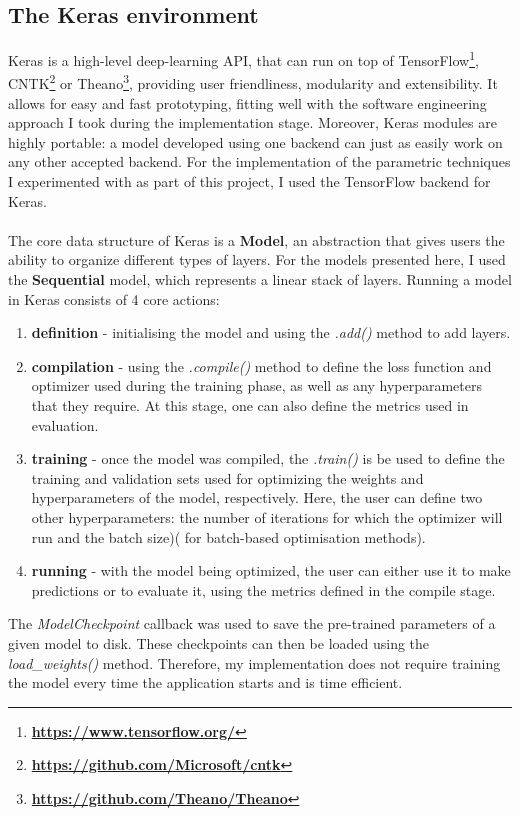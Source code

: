 	\subsection{The Keras environment} \label{Section: impl/ml/ecosys}
	Keras is a high-level deep-learning API, that can run on top of TensorFlow\footnote{\textbf{\url{https://www.tensorflow.org/}}}, CNTK\footnote{\textbf{\url{https://github.com/Microsoft/cntk}}} or Theano\footnote{\textbf{\url{https://github.com/Theano/Theano}}}, providing user friendliness, modularity and extensibility. It allows for easy and fast prototyping, fitting well with the software engineering approach I took during the implementation stage. Moreover, Keras modules are highly portable: a model developed using one backend can just as easily work on any other accepted backend. For the implementation of the parametric techniques I experimented with as part of this project, I used the TensorFlow backend for Keras. 
	\\ \\
	The core data structure of Keras is a \textbf{Model}, an abstraction that gives users the ability to organize different types of layers. For the models presented here, I used the \textbf{Sequential} model, which represents a linear stack of layers. Running a model in Keras consists of 4 core actions:
	\begin{enumerate}
		\item \textbf{definition} - initialising the model and using the \textit{.add()} method to add layers.
		
		\item \textbf{compilation} - using the \textit{.compile()} method to define the loss function and optimizer used during the training phase, as well as any hyperparameters that they require. At this stage, one can also define the metrics used in evaluation. 
		
		\item \textbf{training} - once the model was compiled, the \textit{.train()} is be used to define the training and validation sets used for optimizing the weights and hyperparameters of the model, respectively. Here, the user can define two other hyperparameters: the number of iterations for which the optimizer will run and the batch size)( for batch-based optimisation methods). 
		
		\item \textbf{running} - with the model being optimized, the user can either use it to make predictions or to evaluate it, using the metrics defined in the compile stage. 
	\end{enumerate}
	The \textit{ModelCheckpoint} callback was used to save the pre-trained parameters of a given model to disk. These checkpoints can then be loaded using the \textit{load\_weights()} method. Therefore, my implementation does not require training the model every time the application starts and is time efficient.
	
